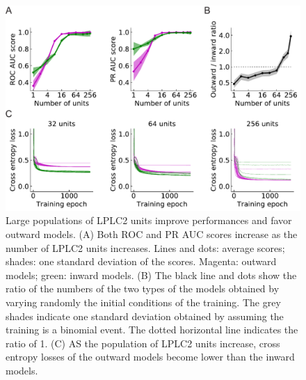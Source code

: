 \documentclass[9pt,lineno]{elife}
\begin{document}
\begin{figure}
\includegraphics[width=\linewidth]{figures/outward_better_than_inward_paper.pdf}
\caption{Large populations of LPLC2 units improve performances and favor outward models. (A) Both ROC and PR AUC scores increase as the number of LPLC2 units increases. Lines and dots: average scores; shades: one standard deviation of the scores. Magenta: outward models; green: inward models. (B) The black line and dots show the ratio of the numbers of the two types of the models obtained by varying randomly the initial conditions of the training. The grey shades indicate one standard deviation obtained by assuming the training is a binomial event. The dotted horizontal line indicates the ratio of 1. (C) AS the population of LPLC2 units increase, cross entropy losses of the outward models become lower than the inward models.}
\label{fig:outward_prevail}

\end{figure}
\end{document}
